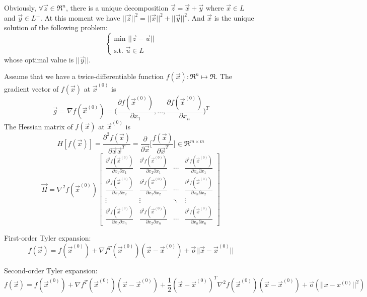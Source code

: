 Obviously, $\forall \vec{z} \in \Re^n$, there is a unique decomposition $\vec{z} = \vec{x} + \vec{y}$ where
$\vec{x}\in L$ and $\vec{y}\in L^{\perp}$. At this moment we have $||\vec{z}||^2 = ||\vec{x}||^2 + ||\vec{y}||^2 $.
And $\vec{x}$ is the unique solution of the following problem:
$$ \left\{ \begin{array}{l}
  \text{min } || \vec{z} - \vec{u} || \\
  \text{s.t. } \vec{u} \in L
  \end{array}\right.  $$
whose optimal value is $||\vec{y}||$.

Assume that we have a twice-differentiable function $f(\vec{x}): \Re^n \mapsto \Re$.
The gradient vector of $f(\vec{x})$ at $\vec{x}^{(0)}$ is
$$ \vec{g} = \nabla f(\vec{x}^{(0)}) = \big( \frac{\partial f(\vec{x}^{(0)})}{\partial x_1},
  \ldots, \frac{\partial f(\vec{x}^{(0)})}{\partial x_n}  \big)^T $$
The Hessian matrix of $f(\vec{x})$ at $\vec{x}^{(0)}$ is
$$ H[f(\vec{x})] = \frac{\partial^2 f(\vec{x})}{\partial \vec{x}\vec{x}^T} =
  \frac{\partial}{\partial \vec{x}} \big[ \frac{f(\vec{x})}{\partial \vec{x}^T} \big] \in \Re^{m\times m}$$
$$ \vec{H} = \nabla^2 f(\vec{x}^{(0)}) \begin{bmatrix}
  \frac{\partial^2 f(\vec{x}^{(0)})}{\partial x_1 \partial x_1} & \frac{\partial^2 f(\vec{x}^{(0)})}{\partial x_2 \partial x_1} &
  \cdots & \frac{\partial^2 f(\vec{x}^{(0)})}{\partial x_n \partial x_1} \\
  \frac{\partial^2 f(\vec{x}^{(0)})}{\partial x_1 \partial x_2} & \frac{\partial^2 f(\vec{x}^{(0)})}{\partial x_2 \partial x_2} &
  \cdots & \frac{\partial^2 f(\vec{x}^{(0)})}{\partial x_n \partial x_2} \\
  \vdots & \vdots & \ddots & \vdots \\
  \frac{\partial^2 f(\vec{x}^{(0)})}{\partial x_1 \partial x_n} & \frac{\partial^2 f(\vec{x}^{(0)})}{\partial x_2 \partial x_n} &
  \cdots & \frac{\partial^2 f(\vec{x}^{(0)})}{\partial x_n \partial x_n}
  \end{bmatrix} $$

First-order Tyler expansion:
$$ f(\vec{x}) = f(\vec{x}^{(0)}) + \nabla f^T(\vec{x}^{(0)})(\vec{x}-\vec{x}^{(0)}) + \vec{o}||\vec{x}-\vec{x}^{(0)}|| $$

Second-order Tyler expansion:
$$ f(\vec{x}) = f(\vec{x}^{(0)}) + \nabla f^T(\vec{x}^{(0)})(\vec{x}-\vec{x}^{(0)}) + 
   \frac{1}{2}(\vec{x} - \vec{x}^{(0)})^T \nabla^2 f(\vec{x}^{(0)}) (\vec{x}-\vec{x}^{(0)}) +
   \vec{o}(||x-x^{(0)}||^2) $$

